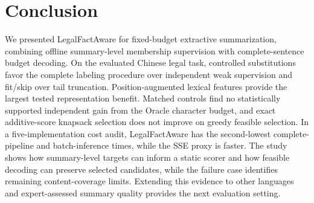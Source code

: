 \documentclass[10pt,twocolumn,letterpaper]{article}
\begin{document}
\section{Conclusion}\label{conclusion}
We presented LegalFactAware for fixed-budget extractive summarization, combining offline summary-level membership supervision with complete-sentence budget decoding. On the evaluated Chinese legal task, controlled substitutions favor the complete labeling procedure over independent weak supervision and fit/skip over tail truncation. Position-augmented lexical features provide the largest tested representation benefit. Matched controls find no statistically supported independent gain from the Oracle character budget, and exact additive-score knapsack selection does not improve on greedy feasible selection. In a five-implementation cost audit, LegalFactAware has the second-lowest complete-pipeline and batch-inference times, while the SSE proxy is faster. The study shows how summary-level targets can inform a static scorer and how feasible decoding can preserve selected candidates, while the failure case identifies remaining content-coverage limits. Extending this evidence to other languages and expert-assessed summary quality provides the next evaluation setting.
\end{document}
